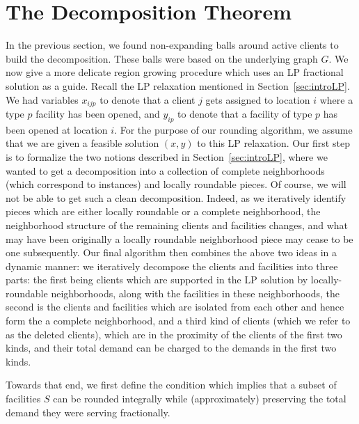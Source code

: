 \newpage
\section{The Decomposition Theorem}
In the previous section, we found non-expanding balls around active clients to build the decomposition. These balls were based on the underlying graph $G$. We now give a more 
delicate region growing procedure which uses an LP fractional solution as a guide. Recall the LP relaxation mentioned in Section~\ref{sec:introLP}. 
We had variables $x_{ijp}$ to denote that a client $j$ gets assigned to location $i$ where a type $p$ facility has been opened, and $y_{ip}$ to denote that a facility of type $p$ has been opened at location $i$. 
For the purpose of our rounding algorithm, we assume that we are given a feasible solution $(x,y)$ to this LP relaxation. 
Our first step is to formalize the two notions described in Section~\ref{sec:introLP}, where
we wanted to get  a decomposition into a collection of complete neighborhoods (which correspond to \cckp instances)  and locally roundable pieces. 
Of course, we will not be able to get such a clean decomposition. Indeed, as we iteratively identify pieces which are either locally roundable or a 
complete neighborhood, the neighborhood structure of the remaining clients and facilities changes, and what may have been originally a locally roundable neighborhood piece may cease to be one subsequently. Our final algorithm then combines the above two ideas in a dynamic manner: we iteratively decompose the clients and facilities into three parts: the first being clients which are supported in the LP solution by locally-roundable neighborhoods, along with the facilities in these neighborhoods, the second is the clients and facilities which are isolated from each other and hence form the a complete neighborhood, and a third kind of clients (which we refer to as the deleted clients), which are in the proximity of the clients of the first two kinds, and their total demand can be charged to the demands in the first two kinds.


Towards that end, we first define the condition which implies that a subset of facilities $S$ can be rounded integrally while (approximately) preserving the total demand they were serving fractionally.

